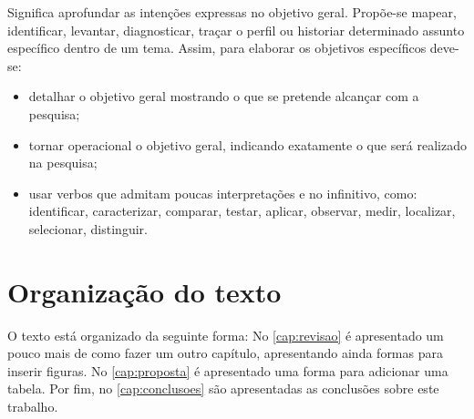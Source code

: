 Significa aprofundar as intenções expressas no objetivo geral. Propõe-se mapear, identificar, levantar, diagnosticar, traçar o perfil ou historiar determinado assunto específico dentro de um tema. Assim, para elaborar os objetivos específicos deve-se:

\begin{itemize}
   \item detalhar o objetivo geral mostrando o que se pretende alcançar com a pesquisa;
   \item tornar operacional o objetivo geral, indicando exatamente o que será realizado na pesquisa;
   \item usar verbos que admitam poucas interpretações e no infinitivo, como: identificar, caracterizar, comparar, testar, aplicar, observar, medir, localizar, selecionar, distinguir.
\end{itemize}


\section{Organização do texto}

O texto está organizado da seguinte forma: No \autoref{cap:revisao} é apresentado um pouco mais de como fazer um outro capítulo, apresentando ainda formas para inserir figuras. No \autoref{cap:proposta} é apresentado uma forma para adicionar uma tabela. Por fim, no \autoref{cap:conclusoes} são apresentadas as conclusões sobre este trabalho.
